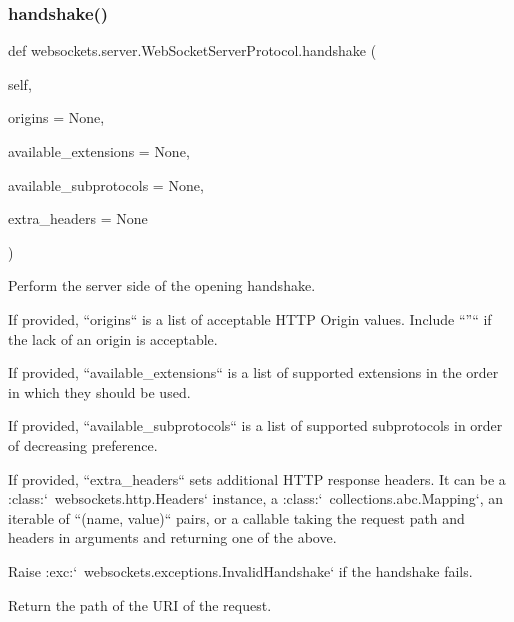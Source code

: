 \subsubsection{\texorpdfstring{handshake()}{handshake()}}
{\footnotesize\ttfamily def websockets.\+server.\+Web\+Socket\+Server\+Protocol.\+handshake (\begin{DoxyParamCaption}\item[{}]{self,  }\item[{}]{origins = {\ttfamily None},  }\item[{}]{available\+\_\+extensions = {\ttfamily None},  }\item[{}]{available\+\_\+subprotocols = {\ttfamily None},  }\item[{}]{extra\+\_\+headers = {\ttfamily None} }\end{DoxyParamCaption})}

\begin{DoxyVerb}Perform the server side of the opening handshake.

If provided, ``origins`` is a list of acceptable HTTP Origin values.
Include ``''`` if the lack of an origin is acceptable.

If provided, ``available_extensions`` is a list of supported
extensions in the order in which they should be used.

If provided, ``available_subprotocols`` is a list of supported
subprotocols in order of decreasing preference.

If provided, ``extra_headers`` sets additional HTTP response headers.
It can be a :class:`~websockets.http.Headers` instance, a
:class:`~collections.abc.Mapping`, an iterable of ``(name, value)``
pairs, or a callable taking the request path and headers in arguments
and returning one of the above.

Raise :exc:`~websockets.exceptions.InvalidHandshake` if the handshake
fails.

Return the path of the URI of the request.\end{DoxyVerb}
 \mbox{\label{classwebsockets_1_1server_1_1_web_socket_server_protocol_a6357e663ec5b0680f14cb322244b2b8e}} 
